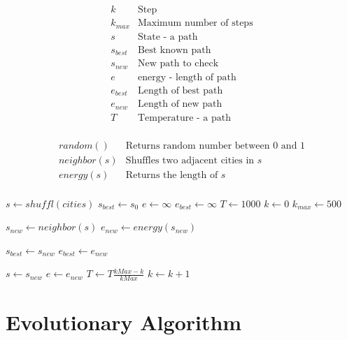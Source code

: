 \documentclass[letterpaper, 11 pt]{article}
\begin{document}
\[
\begin{array}{c|l}
k & \textrm{Step}\\
k_{max} & \textrm{Maximum number of steps}\\
s & \textrm{State - a path}\\
s_{best} & \textrm{Best known path}\\
s_{new} & \textrm{New path to check}\\
e & \textrm{energy - length of path}\\
e_{best} & \textrm{Length of best path}\\
e_{new} & \textrm{Length of new path}\\
T & \textrm{Temperature - a path}\\
\end{array}\]

\[
\begin{array}{c|l}
random() & \textrm{Returns random number between 0 and 1}\\
neighbor(s) & \textrm{Shuffles two adjacent cities in }s\\
energy(s) & \textrm{Returns the length of }s\\
\end{array}\]

\begin{algorithmic}
\STATE $s \gets shuffl(cities)$
\STATE $s_{best} \gets s_0$
\STATE $e \gets \infty$
\STATE $e_{best} \gets \infty$
\STATE $T \gets 1000$
\STATE $k \gets 0$
\STATE $k_{max} \gets 500$

		\STATE $s_{new} \gets neighbor(s)$
		\STATE $e_{new} \gets energy(s_{new})$
		
			\STATE $s_{best} \gets s_{new}$
			\STATE $e_{best} \gets e_{new}$
		\ENDIF

			\STATE $s \gets s_{new}$
			\STATE $e \gets e_{new}$
		\ENDIF
		\STATE $T \gets T \frac{kMax-k}{kMax}$
		\STATE $k \gets k + 1$
		
\ENDWHILE
\end{algorithmic}



\section{Evolutionary Algorithm}
\end{document}

